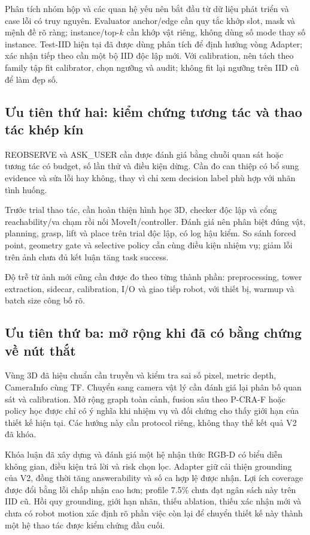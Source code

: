 Phân tích nhóm hộp và các quan hệ yếu nên bắt đầu từ dữ liệu phát
triển và case lỗi có truy nguyên. Evaluator anchor/edge cần quy tắc
khớp slot, mask và mệnh đề rõ ràng; instance/top-$k$ cần khớp vật
riêng, không dùng số mode thay số instance. Test-IID hiện tại đã được dùng phân tích để định hướng vòng Adapter; xác nhận tiếp theo cần một bộ IID độc lập mới. Với calibration, nên tách theo family tập fit calibrator, chọn ngưỡng và audit; không fit lại ngưỡng trên IID cũ để làm đẹp số.

\subsection{Ưu tiên thứ hai: kiểm chứng tương tác và thao tác khép kín}

REOBSERVE và ASK\_USER cần được đánh giá bằng chuỗi quan sát hoặc
tương tác có budget, số lần thử và điều kiện dừng. Cần đo can thiệp
có bổ sung evidence và sửa lỗi hay không, thay vì chỉ xem decision
label phù hợp với nhãn tình huống.

Trước trial thao tác, cần hoàn thiện hình học 3D, checker độc lập
và cổng reachability/va chạm rồi nối MoveIt/controller. Đánh giá
nên phân biệt đúng vật, planning, grasp, lift và place trên trial
độc lập, có log hậu kiểm. So sánh forced point, geometry gate và
selective policy cần cùng điều kiện nhiệm vụ; giảm lỗi trên ảnh
chưa đủ kết luận tăng task success.

Độ trễ từ ảnh mới cũng cần được đo theo từng thành phần:
preprocessing, tower extraction, sidecar, calibration, I/O và
giao tiếp robot, với thiết bị, warmup và batch size công bố rõ.

\subsection{Ưu tiên thứ ba: mở rộng khi đã có bằng chứng về nút thắt}

Vùng 3D đã hiệu chuẩn cần truyền và kiểm tra sai số pixel, metric
depth, CameraInfo cùng TF. Chuyển sang camera vật lý cần đánh giá
lại phân bố quan sát và calibration. Mở rộng graph toàn cảnh,
fusion sâu theo P-CRA-F hoặc policy học được chỉ có ý nghĩa khi
nhiệm vụ và đối chứng cho thấy giới hạn của thiết kế hiện tại.
Các hướng này cần protocol riêng, không thay thế kết quả V2 đã khóa.

Khóa luận đã xây dựng và đánh giá một hệ nhận thức RGB-D có biểu
diễn không gian, điều kiện trả lời và risk chọn lọc. Adapter giữ
cải thiện grounding của V2, đồng thời tăng answerability và số ca
hợp lệ được nhận. Lợi ích coverage được đổi bằng lỗi chấp nhận cao hơn;
profile 7.5\% chưa đạt ngân sách này trên IID cũ. Hồi quy grounding,
giới hạn nhãn, thiếu ablation, thiếu xác nhận mới và chưa có robot motion
xác định rõ phần việc còn lại
để chuyển thiết kế này thành một hệ thao tác được kiểm chứng đầu cuối.
